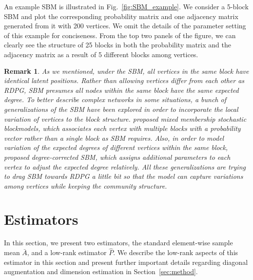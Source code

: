 \documentclass[10pt,letterpaper]{article}
\newtheorem{remark}[fact]{Remark}
\renewcommand{\hat}{\widehat}
\begin{document}
An example SBM is illustrated in Fig.~\ref{fig:SBM_example}.
We consider a 5-block SBM and plot the corresponding probability matrix and one adjacency matrix generated from it with 200 vertices. We omit the details of the parameter setting of this example for conciseness. From the top two panels of the figure, we can clearly see the structure of 25 blocks in both the probability matrix and the adjacency matrix as a result of 5 different blocks among vertices.

\begin{remark}
As we mentioned, under the SBM, all vertices in the same block have identical latent positions. Rather than allowing vertices differ from each other as RDPG, SBM presumes all nodes within the same block have the same expected degree. To better describe complex networks in some situations, a bunch of generalizations of the SBM have been explored in order to incorporate the local variation of vertices to the block structure. \citet{airoldi2008mixed} proposed mixed membership stochastic blockmodels, which associates each vertex with multiple blocks with a probability vector rather than a single block as SBM requires. Also, in order to model variation of the expected degrees of different vertices within the same block, \citet{karrer2011stochastic} proposed degree-corrected SBM, which assigns additional parameters to each vertex to adjust the expected degree relatively. All these generalizations are trying to drag SBM towards RDPG a little bit so that the model can capture variations among vertices while keeping the community structure.
\end{remark}


\section{Estimators}
\label{sec:estimator}

In this section, we present two estimators, the standard element-wise sample mean $\bar{A}$, and a low-rank estimator $\hat{P}$.
We describe the low-rank aspects of this estimator in this section and present further important details regarding diagonal augmentation and dimension estimation in Section~\ref{sec:method}.
\end{document}
